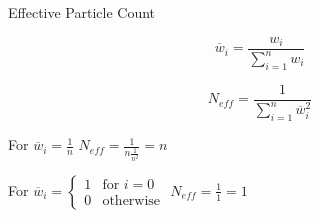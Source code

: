 \documentclass{beamer}
\begin{document}
\begin{frame}{Effective Particle Count}

\begin{equation}
\overline{w}_{i} = \frac{w_{i}}{\sum_{i=1}^{n} w_{i}}
\end{equation}

\vspace{0.2cm}

\begin{equation}
N_{eff} = \frac{1}{\sum_{i=1}^{n} \overline{w}_{i}^2}
\end{equation}

\vspace{1cm}

\begin{center}

For \hspace{0.3cm} \(\overline{w}_{i}=\frac{1}{n}\) \hspace{2.4cm} \(N_{eff} = \frac{1}{n\frac{1}{n^2}} = n \)

\vspace{1cm}

For \hspace{0.3cm} \(
\overline{w}_{i} = \begin{cases}

  1 & \text{for $i=0$} \\

  0 & \text{otherwise}

\end{cases}
\)\hspace{0.4cm} \(N_{eff} = \frac{1}{1} = 1 \)

\end{center}

\end{frame}

\end{document}

